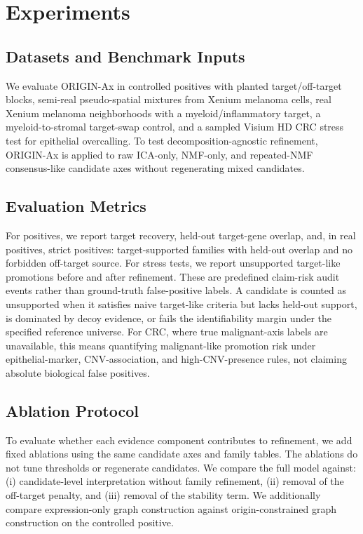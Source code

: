\documentclass[conference]{IEEEtran}
\begin{document}
\section{Experiments}

\subsection{Datasets and Benchmark Inputs}

We evaluate ORIGIN-Ax in controlled positives with planted target/off-target
blocks, semi-real pseudo-spatial mixtures from Xenium melanoma cells, real
Xenium melanoma neighborhoods with a myeloid/inflammatory target, a
myeloid-to-stromal target-swap control, and a sampled Visium HD CRC stress test
for epithelial overcalling. To test decomposition-agnostic refinement, ORIGIN-Ax
is applied to raw ICA-only, NMF-only, and repeated-NMF consensus-like candidate
axes without regenerating mixed candidates.

\subsection{Evaluation Metrics}

For positives, we report target recovery, held-out target-gene overlap, and, in
real positives, strict positives: target-supported families with held-out
overlap and no forbidden off-target source. For stress tests, we report
unsupported target-like promotions before and after refinement. These are
predefined claim-risk audit events rather than ground-truth false-positive
labels. A candidate is counted as unsupported when it satisfies naive
target-like criteria but lacks held-out support, is dominated by decoy evidence,
or fails the identifiability margin under the specified reference universe. For
CRC, where true malignant-axis labels are unavailable, this means quantifying
malignant-like promotion risk under epithelial-marker, CNV-association, and
high-CNV-presence rules, not claiming absolute biological false positives.

\subsection{Ablation Protocol}

To evaluate whether each evidence component contributes to refinement, we add
fixed ablations using the same candidate axes and family tables. The ablations
do not tune thresholds or regenerate candidates. We compare the full model
against: (i) candidate-level interpretation without family refinement, (ii)
removal of the off-target penalty, and (iii) removal of the stability term. We
additionally compare expression-only graph construction against
origin-constrained graph construction on the controlled positive.
\end{document}
